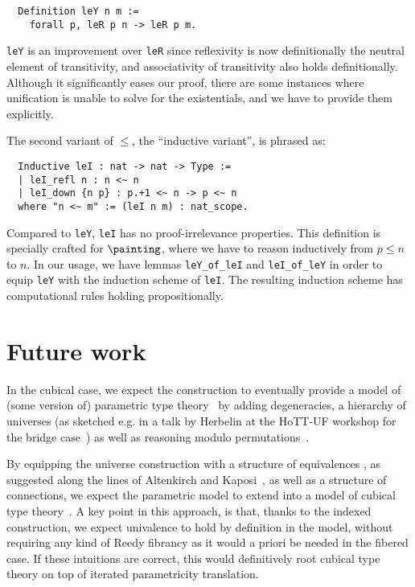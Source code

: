 \documentclass[10pt]{art.cls/art}
\begin{document}
\begin{verbatim}
  Definition leY n m :=
    forall p, leR p n -> leR p m.
\end{verbatim}

\texttt{leY} is an improvement over \texttt{leR} since reflexivity is now definitionally the neutral element of transitivity, and associativity of transitivity also holds definitionally. Although it significantly eases our proof, there are some instances where unification is unable to solve for the existentials, and we have to provide them explicitly.

The second variant of $\leq$, the ``inductive variant'', is phrased as:

\begin{verbatim}
  Inductive leI : nat -> nat -> Type :=
  | leI_refl n : n <~ n
  | leI_down {n p} : p.+1 <~ n -> p <~ n
  where "n <~ m" := (leI n m) : nat_scope.
\end{verbatim}

Compared to \texttt{leY}, \texttt{leI} has no proof-irrelevance properties. This definition is specially crafted for $\painting$, where we have to reason inductively from $p \leq n$ to $n$. In our usage, we have lemmas \texttt{leY\_of\_leI} and \texttt{leI\_of\_leY} in order to equip \texttt{leY} with the induction scheme of \texttt{leI}. The resulting induction scheme has computational rules holding propositionally.

\section{Future work}
In the cubical case, we expect the construction to eventually provide a model of (some version of) parametric type theory~\cite{nuyts17,cavallo19} by adding degeneracies, a hierarchy of universes (as sketched e.g. in a talk by Herbelin at the HoTT-UF workshop for the bridge case~\cite{herbelin-hott-uf}) as well as reasoning modulo permutations~\cite{grandis03}.

By equipping the universe construction with a structure of equivalences , as suggested along the lines of Altenkirch and Kaposi~\cite{altenkirch15}, as well as a structure of connections, we expect the parametric model to extend into a model of cubical type theory~\cite{bezem13}. A key point in this approach, is that, thanks to the indexed construction, we expect univalence to hold by definition in the model, without requiring any kind of Reedy fibrancy as it would a priori be needed in the fibered case. If these intuitions are correct, this would definitively root cubical type theory on top of iterated parametricity translation.



\end{document}
